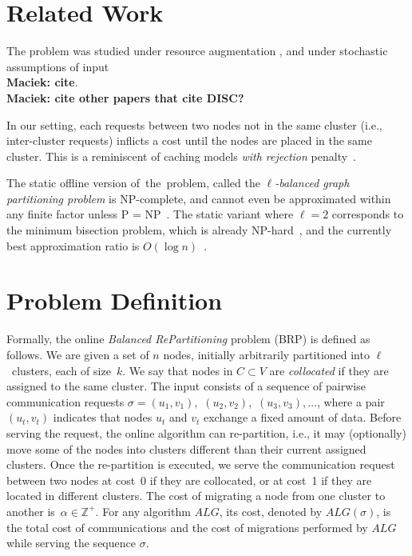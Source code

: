 \documentclass[manuscript,screen=true]{acmart}
\newcommand{\OBRP}{BRP}
\newcommand\maciek[1]{\color{brown}\textbf{\\ Maciek: #1}\color{black}}
\begin{document}
\section{Related Work}

The problem was studied under resource augmentation \cite{repartition-disc}, and under stochastic assumptions of input\maciek{cite}.\maciek{cite other papers that cite DISC?}

In our
setting,
each  requests between two nodes  not in the same cluster
(i.e., inter-cluster requests) inflicts a cost until the nodes are placed in the same cluster.
This is a reminiscent of caching models \emph{with
rejection} penalty~\cite{EpImLN11,EpImLN15,Irani02}.

The static offline version of~the~problem, called the
\emph{$\ell$-balanced graph partitioning problem} is 
NP-complete, and cannot even be approximated within any finite factor unless P
= NP~\cite{AndRae06}. The static
variant where $\ell = 2$ corresponds to the minimum bisection problem, which
is already NP-hard~\cite{GaJoSt76}, and 
the currently best approximation ratio is $O(\log n)$~\cite{SarVaz95,ArKaKa99,FeKrNi00,FeiKra02,KraFei06,Raec08}.




\section{Problem Definition}
\label{sec:problem-definition}

Formally, the online \emph{Balanced RePartitioning} problem (\OBRP{}) is defined as
follows. We are given a set of $n$ nodes,
initially arbitrarily partitioned into $\ell$~clusters,
each of size~$k$.
We say that nodes in $C \subset V$ are \emph{collocated}
if they are assigned to the same cluster.
The input consists of a sequence of pairwise communication requests
$\sigma = (u_1,v_1),$ $(u_2,v_2),$ $(u_3,v_3), \ldots$,
where a pair $(u_t,v_t)$ indicates that nodes $u_t$ and $v_t$ exchange a fixed amount of data.
Before serving the request,
the online algorithm can re-partition,
i.e.,
it may (optionally) move some of the nodes into clusters different than their current assigned clusters.
Once the re-partition is executed,
we serve
the communication request between two  nodes at cost~0 if they are collocated,
or at cost~1 if they are located in different clusters.
The cost of migrating a node from one cluster to another
is~$\alpha \in \mathbb{Z}^+$.
For any algorithm $ALG$,
its cost,
denoted by $ALG(\sigma)$,
is the total cost of communications and
the cost of migrations performed by $ALG$ while serving the sequence $\sigma$.
\end{document}
